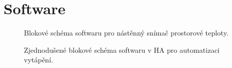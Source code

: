 \section{Software}
\label{app:software}

\begin{figure}[H]
    \centering
    \def\svgwidth{\columnwidth}
    
    \caption{Blokové schéma softwaru pro nástěnný snímač prostorové teploty.}
    \label{fig:blokove-schema-nastenny-snimac-prostorove-teploty-ethernet}
\end{figure}

\begin{sidewaysfigure}
    \centering
    \def\svgwidth{\columnwidth}
    \scalebox{0.83}{}
    \caption{Zjednodušené blokové schéma softwaru v HA pro automatizaci vytápění.}
    \label{fig:blokove-schema-ha}
\end{sidewaysfigure}
